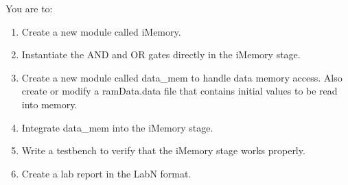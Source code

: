 You are to:
\begin{enumerate}
\item Create a new module called iMemory.
\item Instantiate the AND and OR gates directly in the iMemory stage.
\item Create a new module called data\_mem to handle data memory access.  Also create or modify a ramData.data file that contains initial values to be read into memory.
\item Integrate data\_mem into the iMemory stage.  
\item Write a testbench to verify that the iMemory stage works properly. 
\item Create a lab report in the LabN format.
\end{enumerate} 